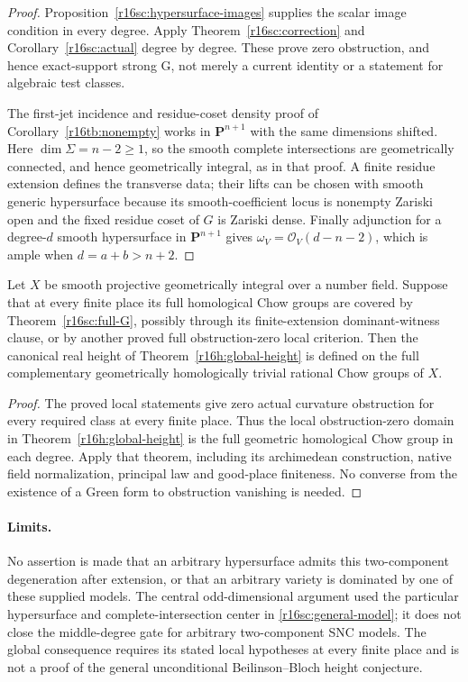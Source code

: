 \begin{proof}
Proposition~\ref{r16sc:hypersurface-images} supplies the
scalar image condition in every degree. Apply
Theorem~\ref{r16sc:correction} and
Corollary~\ref{r16sc:actual} degree by degree. These prove
zero obstruction, and hence exact-support strong G, not merely
a current identity or a statement for algebraic test classes.

The first-jet incidence and residue-coset density proof of
Corollary~\ref{r16tb:nonempty} works in
$\mathbf P^{n+1}$ with the same dimensions shifted.
Here $\dim\Sigma=n-2\geq1$, so the smooth complete intersections
are geometrically connected, and hence geometrically integral,
as in that proof. A finite residue extension defines the
transverse data; their lifts can be chosen with smooth generic
hypersurface because its smooth-coefficient locus is nonempty
Zariski open and the fixed residue coset of $G$ is Zariski dense.
Finally adjunction for a degree-$d$ smooth hypersurface in
$\mathbf P^{n+1}$ gives $\omega_V=\mathcal O_V(d-n-2)$,
which is ample when $d=a+b>n+2$.
\end{proof}

\begin{corollary}
\label{r16sc:height}
Let $X$ be smooth projective geometrically integral over a number
field. Suppose that at every finite place its full homological
Chow groups are covered by Theorem~\ref{r16sc:full-G}, possibly
through its finite-extension dominant-witness clause, or by
another proved full obstruction-zero local criterion.
Then the canonical real height of Theorem~\ref{r16h:global-height}
is defined on the full complementary geometrically homologically
trivial rational Chow groups of $X$.
\end{corollary}

\begin{proof}
The proved local statements give zero actual curvature obstruction
for every required class at every finite place. Thus the local
obstruction-zero domain in Theorem~\ref{r16h:global-height}
is the full geometric homological Chow group in each degree.
Apply that theorem, including its archimedean construction,
native field normalization, principal law and good-place finiteness.
No converse from the existence of a Green form to obstruction
vanishing is needed.
\end{proof}

\paragraph{Limits.}
No assertion is made that an arbitrary hypersurface admits this
two-component degeneration after extension, or that an arbitrary
variety is dominated by one of these supplied models. The central
odd-dimensional argument used the particular hypersurface and
complete-intersection center in \eqref{r16sc:general-model}; it
does not close the middle-degree gate for arbitrary two-component
SNC models. The global consequence requires its stated local
hypotheses at every finite place and is not a proof of the general
unconditional Beilinson--Bloch height conjecture.
